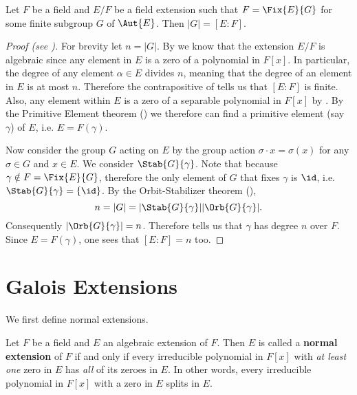 \begin{theorem}\label{thrm-fixed-field}
    Let $F$ be a field and $E/F$ be a field extension such that $F = \Fix{E}{G}$ for some finite subgroup $G$ of $\Aut{E}$. Then $|G| = [E:F]$.
\end{theorem}
\begin{proof}[Proof (see {\cite[Theorem 16.5.4]{artin_2011}})]
    For brevity let $n = |G|$. By  we know that the extension $E/F$ is algebraic since any element in $E$ is a zero of a polynomial in $F[x]$. In particular, the degree of any element $\alpha \in E$ divides $n$, meaning that the degree of an element in $E$ is at most $n$. Therefore the contrapositive of  tells us that $[E:F]$ is finite. Also, any element within $E$ is a zero of a separable polynomial in $F[x]$ by . By the Primitive Element theorem () we therefore can find a primitive element (say $\gamma$) of $E$, i.e. $E = F(\gamma)$.

    Now consider the group $G$ acting on $E$ by the group action $\sigma\cdot x = \sigma(x)$ for any $\sigma \in G$ and $x \in E$. We consider $\Stab{G}{\gamma}$. Note that because $\gamma \notin F = \Fix{E}{G}$, therefore the only element of $G$ that fixes $\gamma$ is $\id$, i.e. $\Stab{G}{\gamma} = \{\id\}$. By the Orbit-Stabilizer theorem (),
    \[
        n = |G| = |\Stab{G}{\gamma}||\Orb{G}{\gamma}|.
    \]
    Consequently $|\Orb{G}{\gamma}| = n$. Therefore  tells us that $\gamma$ has degree $n$ over $F$. Since $E = F(\gamma)$, one sees that $[E:F] = n$ too.
\end{proof}

\section{Galois Extensions}
We first define normal extensions.

\begin{definition}
    Let $F$ be a field and $E$ an algebraic extension of $F$. Then $E$ is called a \textbf{normal extension} of $F$ if and only if every irreducible polynomial in $F[x]$ with \textit{at least one} zero in $E$ has \textit{all} of its zeroes in $E$. In other words, every irreducible polynomial in $F[x]$ with a zero in $E$ splits in $E$.
\end{definition}

